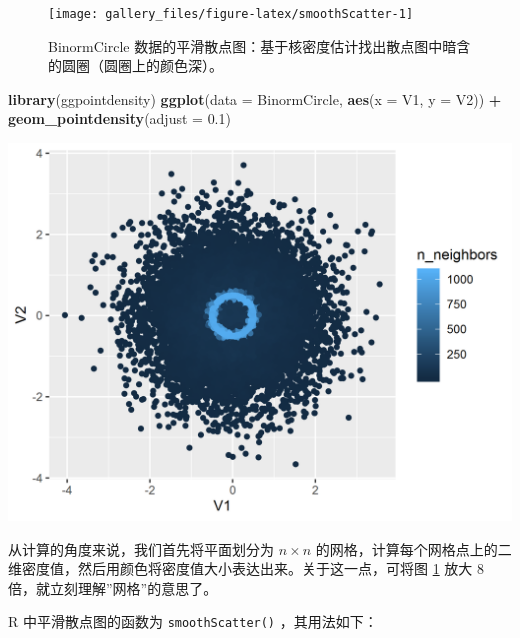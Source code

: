 \documentclass[
  b5paper,
  UTF8,twoside]{book}
\newenvironment{Shaded}{\begin{snugshade}}{\end{snugshade}}
\newcommand{\AttributeTok}[1]{\textcolor[rgb]{0.13,0.29,0.53}{#1}}
\newcommand{\FloatTok}[1]{\textcolor[rgb]{0.00,0.00,0.81}{#1}}
\newcommand{\FunctionTok}[1]{\textcolor[rgb]{0.13,0.29,0.53}{\textbf{#1}}}
\newcommand{\NormalTok}[1]{#1}
\newcommand{\SpecialCharTok}[1]{\textcolor[rgb]{0.81,0.36,0.00}{\textbf{#1}}}
\begin{document}
\begin{figure}

{\centering \texttt{[image: gallery\_files/figure-latex/smoothScatter-1]} 

}

\caption[BinormCircle 数据的平滑散点图]{BinormCircle 数据的平滑散点图：基于核密度估计找出散点图中暗含的圆圈（圆圈上的颜色深）。}\label{fig:smoothScatter}
\end{figure}

\begin{Shaded}
\begin{Highlighting}[]
\FunctionTok{library}\NormalTok{(ggpointdensity)}
\FunctionTok{ggplot}\NormalTok{(}\AttributeTok{data =}\NormalTok{ BinormCircle, }\FunctionTok{aes}\NormalTok{(}\AttributeTok{x =}\NormalTok{ V1, }\AttributeTok{y =}\NormalTok{ V2)) }\SpecialCharTok{+}
  \FunctionTok{geom\_pointdensity}\NormalTok{(}\AttributeTok{adjust =} \FloatTok{0.1}\NormalTok{)}
\end{Highlighting}
\end{Shaded}

\begin{center}\includegraphics{images/smoothScatter-ggplot} \end{center}

从计算的角度来说，我们首先将平面划分为 \(n\times n\) 的网格，计算每个网格点上的二维密度值，然后用颜色将密度值大小表达出来。关于这一点，可将图 \ref{fig:smoothScatter} 放大 8 倍，就立刻理解''网格''的意思了。

R 中平滑散点图的函数为 \texttt{smoothScatter()} ，其用法如下：
\end{document}
